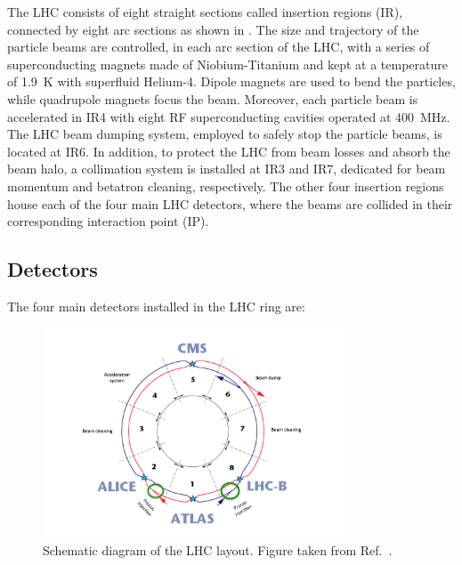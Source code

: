 The LHC consists of eight straight sections called insertion regions (IR), connected by eight arc sections as shown in . The size and trajectory of the particle beams are controlled, in each arc section of the LHC, with a series of superconducting magnets made of Niobium-Titanium and kept at a temperature of \SI{1.9}{\K} with superfluid Helium-4. Dipole magnets are used to bend the particles, while quadrupole magnets focus the beam. Moreover, each particle beam is accelerated in IR4 with eight RF superconducting cavities operated at \SI{400}{\MHz}. The LHC beam dumping system, employed to safely stop the particle beams, is located at IR6. In addition, to protect the LHC from beam losses and absorb the beam halo, a collimation system is installed at IR3 and IR7, dedicated for beam momentum and betatron cleaning, respectively. The other four insertion regions house each of the four main LHC detectors, where the beams are collided in their corresponding interaction point (IP).

\subsection{Detectors}\label{sec:Experiment_LHC_Detectors}

The four main detectors installed in the LHC ring are:

\begin{figure}[!htbp]
 \centering
 \includegraphics[width=0.8\textwidth]{Figures/Experiment/LHC/LHCLayout.png}
 \caption{Schematic diagram of the LHC layout. Figure taken from Ref.~\cite{LHCLayoutImage}.}
 \label{fig:LHCLayout}
\end{figure}

